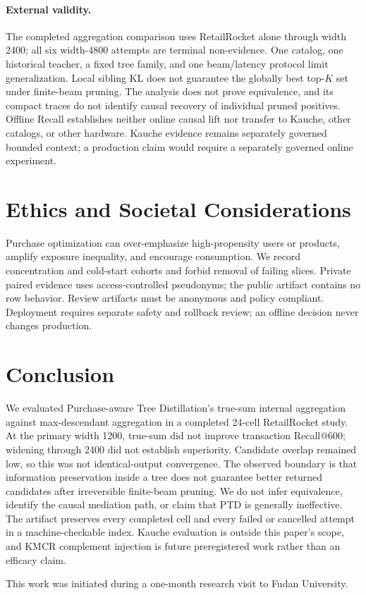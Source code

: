 \documentclass[sigconf,natbib=true]{acmart}
\begin{document}
\paragraph{External validity.}
The completed aggregation comparison uses RetailRocket alone through width 2400; all six width-4800 attempts are terminal non-evidence. One catalog, one historical teacher, a fixed tree family, and one beam/latency protocol limit generalization. Local sibling KL does not guarantee the globally best top-$K$ set under finite-beam pruning. The analysis does not prove equivalence, and its compact traces do not identify causal recovery of individual pruned positives. Offline Recall establishes neither online causal lift nor transfer to Kauche, other catalogs, or other hardware. Kauche evidence remains separately governed bounded context; a production claim would require a separately governed online experiment.

\section{Ethics and Societal Considerations}
Purchase optimization can over-emphasize high-propensity users or products, amplify exposure inequality, and encourage consumption. We record concentration and cold-start cohorts and forbid removal of failing slices. Private paired evidence uses access-controlled pseudonyms; the public artifact contains no row behavior. Review artifacts must be anonymous and policy compliant. Deployment requires separate safety and rollback review; an offline decision never changes production.

\section{Conclusion}
We evaluated Purchase-aware Tree Distillation's true-sum internal aggregation against max-descendant aggregation in a completed 24-cell RetailRocket study. At the primary width 1200, true-sum did not improve transaction Recall@600; widening through 2400 did not establish superiority. Candidate overlap remained low, so this was not identical-output convergence. The observed boundary is that information preservation inside a tree does not guarantee better returned candidates after irreversible finite-beam pruning. We do not infer equivalence, identify the causal mediation path, or claim that PTD is generally ineffective. The artifact preserves every completed cell and every failed or cancelled attempt in a machine-checkable index. Kauche evaluation is outside this paper's scope, and KMCR complement injection is future preregistered work rather than an efficacy claim.

\ifdefined\PTDAuthorVersion
\begin{acks}
This work was initiated during a one-month research visit to Fudan University.
\end{acks}
\fi

\FloatBarrier


\end{document}
